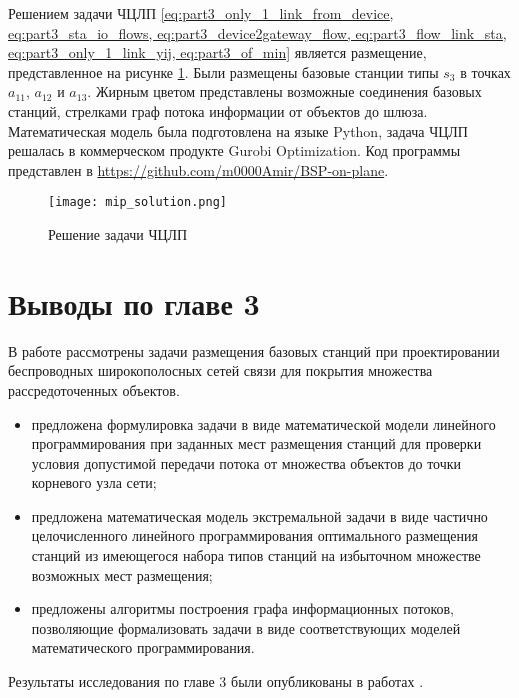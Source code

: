Решением задачи ЧЦЛП \cref{eq:part3_only_1_link_from_device, eq:part3_sta_io_flows, eq:part3_device2gateway_flow, eq:part3_flow_link_sta, eq:part3_only_1_link_yij, eq:part3_of_min} является размещение, представленное на рисунке \cref{fig:part3_mip_solution}. Были размещены базовые станции типы $s_3$ в точках $a_11$, $a_12$ и $a_13$. Жирным цветом представлены возможные соединения базовых станций, стрелками граф потока информации от объектов до шлюза. Математическая модель была подготовлена на языке Python, задача ЧЦЛП решалась в коммерческом продукте Gurobi Optimization.  Код программы представлен в \url{https://github.com/m0000Amir/BSP-on-plane}.

\begin{figure}[hbt!]
    \centering
     \texttt{[image: mip\_solution.png]}
  \caption{Решение задачи ЧЦЛП}
  \label{fig:part3_mip_solution}
\end{figure}

\FloatBarrier
\section{Выводы по главе 3}

В работе рассмотрены задачи размещения базовых станций при проектировании беспроводных широкополосных сетей связи для покрытия множества рассредоточенных объектов. 
\begin{itemize}
    \item предложена формулировка задачи в виде математической модели линейного программирования при заданных мест размещения станций для проверки условия допустимой передачи потока от множества объектов до точки корневого узла сети;
    \item предложена математическая модель экстремальной задачи в виде частично целочисленного линейного программирования оптимального размещения станций из имеющегося набора типов станций на избыточном множестве возможных мест размещения;
    \item предложены алгоритмы построения графа информационных потоков, позволяющие формализовать задачи в виде соответствующих моделей математического программирования. 
\end{itemize}

Результаты исследования по главе 3 были опубликованы в работах \cite{MukhtarovPershinGUBKIN2018_RSCI, 
MukhtarovPershinGUBKIN2019_RSCI,MukhtarovPershinVSPU2019_RSCI, MukhtarovPershinMLSD2019works_RSCI, MukhtarovPershinMLSD2019materials_RSCI,}. 







\FloatBarrier
